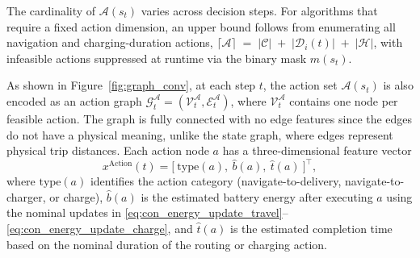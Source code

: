 \documentclass[journal]{IEEEtran}
\begin{document}
The cardinality of $\mathcal{A}(s_t)$ varies across decision steps. For algorithms that require a fixed action dimension, an upper bound follows from enumerating all navigation and charging-duration actions,
$ \lceil\mathcal{A}\rceil \;=\;|\mathcal{C}| \;+\; |\mathcal{D}_{i}(t)| \;+\; |\mathcal{H}|$,
with infeasible actions suppressed at runtime via the binary mask $m(s_t)$.

As shown in Figure~\ref{fig:graph_conv}, at each step $t$, the action set $\mathcal{A}(s_t)$ is also encoded as an action graph $\mathcal{G}^{\mathcal{A}}_t=(\mathcal{V}^{\mathcal{A}}_t,\mathcal{E}^{\mathcal{A}}_t)$,
where $\mathcal{V}^{\mathcal{A}}_t$ contains one node per feasible action. The graph is fully connected with no edge features since the edges do not have a physical meaning, unlike the state graph, where edges represent physical trip distances. 
Each action node $a$ has a three-dimensional feature vector
\begin{equation}
x^{\text{Action}}(t)=\big[\ \mathrm{type}(a),\ \widehat{b}(a),\ \widehat{t}(a)\ \big]^\top,
\label{eq:action_node_features}
\end{equation}
where $\mathrm{type}(a)$ identifies the action category (navigate-to-delivery, navigate-to-charger, or charge),
$\widehat{b}(a)$ is the estimated battery energy after executing $a$ using the nominal updates in \eqref{eq:con_energy_update_travel}--\eqref{eq:con_energy_update_charge}, and
$\widehat{t}(a)$ is the estimated completion time based on the nominal duration of the routing or charging action. 
\end{document}
